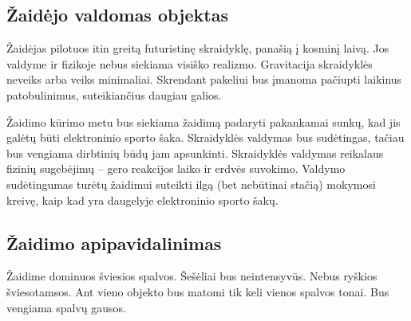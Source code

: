 \subsection{Žaidėjo valdomas objektas}

Žaidėjas pilotuos itin greitą futuristinę skraidyklę, panašią į kosminį laivą.
Jos valdyme ir fizikoje nebus siekiama visiško realizmo.
Gravitacija skraidyklės neveiks arba veiks minimaliai.
Skrendant pakeliui bus įmanoma pačiupti laikinus patobulinimus, suteikiančius daugiau galios.

Žaidimo kūrimo metu bus siekiama žaidimą padaryti pakankamai sunkų, kad jis galėtų būti elektroninio sporto šaka.
Skraidyklės valdymas bus sudėtingas, tačiau bus vengiama dirbtinių būdų jam apsunkinti.
Skraidyklės valdymas reikalaus fizinių sugebėjimų -- gero reakcijos laiko ir erdvės suvokimo.
Valdymo sudėtingumas turėtų žaidimui suteikti ilgą (bet nebūtinai stačią) mokymosi kreivę, kaip kad yra daugelyje elektroninio sporto šakų.

\subsection{Žaidimo apipavidalinimas}

Žaidime dominuos šviesios spalvos.
Šešėliai bus neintensyvūs.
Nebus ryškios šviesotamsos.
Ant vieno objekto bus matomi tik keli vienos spalvos tonai.
Bus vengiama spalvų gausos.
